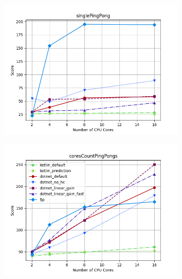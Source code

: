 \documentclass{article}
\begin{document}
\begin{figure}[H]
    \begin{subfigure}[b]{0.48\textwidth}
        \includegraphics[width=\linewidth]{plots/singlePingPong.png}
    \end{subfigure}
    \begin{subfigure}[b]{0.48\textwidth}
        \includegraphics[width=\linewidth]{plots/coresCountPingPongs_with_legend.png}
    \end{subfigure}

    \vspace{1em}


\end{figure}
\end{document}
